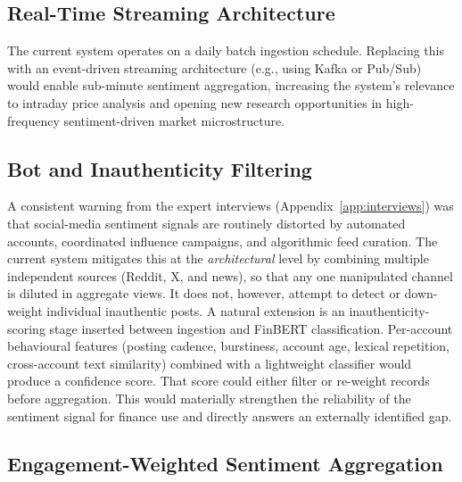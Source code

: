 \subsection{Real-Time Streaming Architecture}

The current system operates on a daily batch ingestion schedule.  Replacing this with an event-driven streaming architecture (e.g., using Kafka or Pub/Sub) would enable sub-minute sentiment aggregation, increasing the system's relevance to intraday price analysis and opening new research opportunities in high-frequency sentiment-driven market microstructure.

\subsection{Bot and Inauthenticity Filtering}

A consistent warning from the expert interviews (Appendix~\ref{app:interviews}) was that social-media sentiment signals are routinely distorted by automated accounts, coordinated influence campaigns, and algorithmic feed curation. The current system mitigates this at the \emph{architectural} level by combining multiple independent sources (Reddit, X, and news), so that any one manipulated channel is diluted in aggregate views. It does not, however, attempt to detect or down-weight individual inauthentic posts. A natural extension is an inauthenticity-scoring stage inserted between ingestion and FinBERT classification. Per-account behavioural features (posting cadence, burstiness, account age, lexical repetition, cross-account text similarity) combined with a lightweight classifier would produce a confidence score. That score could either filter or re-weight records before aggregation. This would materially strengthen the reliability of the sentiment signal for finance use and directly answers an externally identified gap.

\subsection{Engagement-Weighted Sentiment Aggregation}

